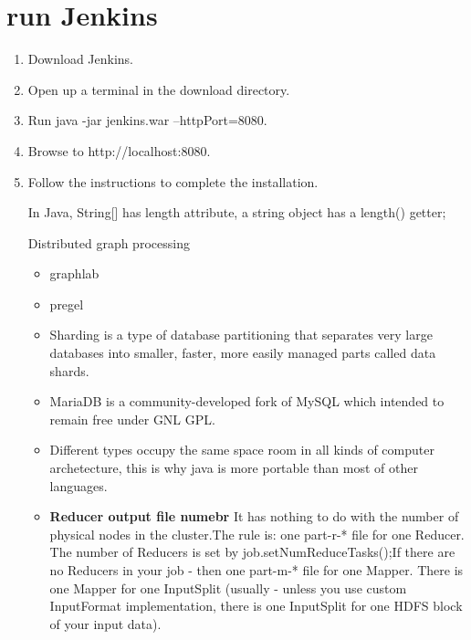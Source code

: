 \documentclass[a4paper]{tufte-handout}
\begin{document}
\chapter{run Jenkins}
\begin{enumerate}
\item{Download Jenkins.}
\item Open up a terminal in the download directory.
\item Run java -jar jenkins.war --httpPort=8080.
\item Browse to http://localhost:8080.
\item Follow the instructions to complete the installation.

In Java, String[] has length attribute, a string object has a length() getter;

Distributed graph processing
\begin{itemize}
\item graphlab
\item pregel
\end{itemize}


\begin{itemize}
\item Sharding is a type of database partitioning that separates very large databases into smaller, faster, more easily managed parts called data shards.
\item MariaDB is a community-developed fork of MySQL which intended to remain free under GNL GPL.
\end{itemize}

\begin{itemize}
\item Different types occupy the same space room in all kinds of computer archetecture, this is why java is more portable than most of other languages.
\end{itemize}
\begin{note}

  \begin{itemize}
    \item \textbf{Reducer output file numebr} It has nothing to do with the number of physical nodes in the cluster.The rule is: one part-r-* file for one Reducer. The number of Reducers is set by job.setNumReduceTasks();If there are no Reducers in your job - then one part-m-* file for one Mapper. There is one Mapper for one InputSplit (usually - unless you use custom InputFormat implementation, there is one InputSplit for one HDFS block of your input data).

  \end{itemize}
\end{note}

\end{enumerate}
\end{document}

